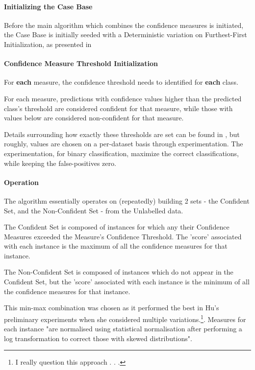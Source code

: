 \documentclass[a4paper,11pt]{report}
\begin{document}
\paragraph{Initializing the Case Base}
Before the main algorithm which combines the confidence measures is initiated, the Case Base is initially seeded with a Deterministic variation on Furthest-First Initialization, as presented in \citet{Greene2007}

\paragraph{Confidence Measure Threshold Initialization}
For \textbf{each} measure, the confidence threshold needs to identified for \textbf{each} class.

For each measure, predictions with confidence values higher than the predicted class's threshold are considered confident for that measure, while those with values below are considered non-confident for that measure.

Details surrounding how exactly these thresholds are set can be found in \citet{Delany2005}, but roughly, values are chosen on a per-dataset basis through experimentation. The experimentation, for binary classification, maximize the correct classifications, while keeping the false-positives zero.

\paragraph{Operation}
The algorithm essentially operates on (repeatedly) building 2 sets - the Confident Set, and the Non-Confident Set - from the Unlabelled data.

The Confident Set is composed of instances for which any their Confidence Measures exceeded the Measure's Confidence Threshold. The 'score' associated with each instance is the maximum of all the confidence measures for that instance.

The Non-Confident Set is composed of instances which do not appear in the Confident Set, but the 'score' associated with each instance is the minimum of all the confidence measures for that instance. 

This min-max combination was chosen as it performed the best in Hu's preliminary experiments when she considered multiple variations.\footnote{I really question this approach . . .}. Measures for each instance "are normalised using statistical normalisation after performing a log transformation to correct those with skewed distributions"\cite{Hu2011}.
\end{document}
